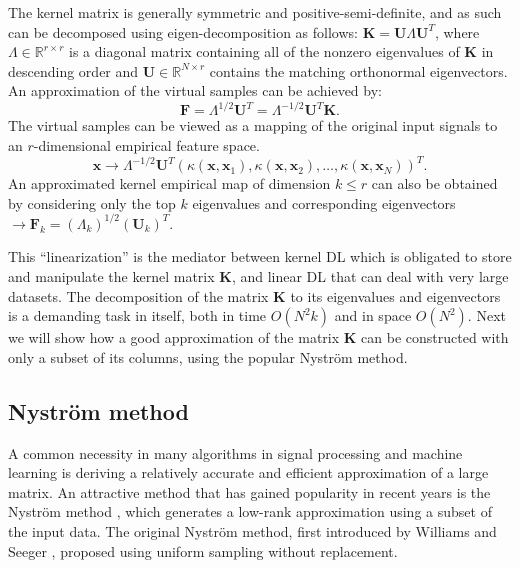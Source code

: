 \documentclass[journal]{IEEEtran}
\newcommand{\bx}{\mathbf{x}}
\newcommand{\bK}{\mathbf{K}}
\newcommand{\bF}{\mathbf{F}}
\newcommand{\bU}{\mathbf{U}}
\begin{document}
The kernel matrix is generally symmetric and positive-semi-definite, and as such can be decomposed using eigen-decomposition as follows: $\bK=\bU \boldsymbol{\varLambda} \bU^T$, where $\boldsymbol{\varLambda} \in \mathbb{R}^{r \times r}$ is a diagonal matrix containing all of the nonzero eigenvalues of $\bK$ in descending order and $\bU \in \mathbb{R}^{N \times r}$ contains the matching orthonormal eigenvectors. An approximation of the virtual samples can be achieved by:
\begin{equation}\label{eq:Mapping}
    \bF = \boldsymbol{\varLambda}^{1/2}  \bU^T = \boldsymbol{\varLambda}^{-1/2}  \bU^T  \bK.
\end{equation}
The virtual samples can be viewed as a mapping of the original input signals to an $r$-dimensional empirical feature space.
\begin{equation}\label{eq:VirtualSamples}
    \bx \rightarrow \boldsymbol{\varLambda}^{-1/2}  \bU^T  \left(\kappa(\bx,\bx_1),\kappa(\bx,\bx_2),\ldots,\kappa(\bx,\bx_N)\right)^T.
\end{equation}
An approximated kernel empirical map of dimension $k \leq r$ can also be obtained by considering only the top $k$ eigenvalues and corresponding eigenvectors $ \rightarrow \bF_k = \left( \boldsymbol{\varLambda}_k \right)^{1/2} \left( \mathbf{U}_k \right)^T$.

This ``linearization'' is the mediator between kernel DL which is obligated to store and manipulate the kernel matrix $\bK$, and linear DL that can deal with very large datasets.
The decomposition of the matrix $\bK$ to its eigenvalues and eigenvectors is a demanding task in itself, both in time $O(N^2k)$ and in space $O(N^2)$. Next we will show how a good approximation of the matrix $\bK$ can be constructed with only a subset of its columns, using the popular Nystr\"{o}m method.

\subsection{Nystr\"{o}m method} \label{SS:Nystrom}

A common necessity in many algorithms in signal processing and machine learning is deriving a relatively accurate and efficient approximation of a large matrix. An attractive method that has gained popularity in recent years is the Nystr\"{o}m method \cite{Nystrom,Nystrom2,Nystrom3}, which generates a low-rank approximation using a subset of the input data. The original Nystr\"{o}m method, first introduced by Williams and Seeger \cite{Nystrom}, proposed using uniform sampling without replacement.
\end{document}
